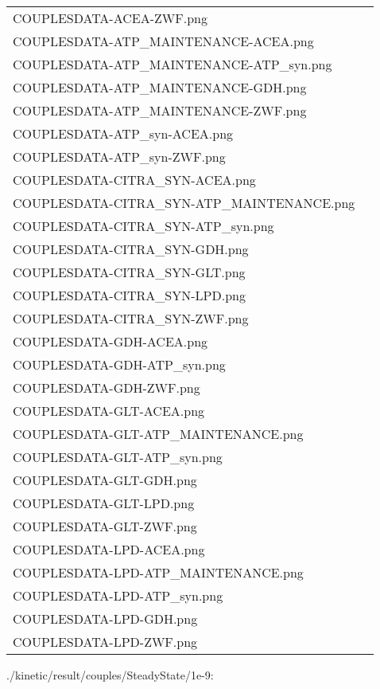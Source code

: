 \documentclass[a4paper, parskip=full]{scrreprt}
\begin{document}
\begin{longtable}{ll}
COUPLESDATA-ACEA-ZWF.png\\
COUPLESDATA-ATP\_MAINTENANCE-ACEA.png\\
COUPLESDATA-ATP\_MAINTENANCE-ATP\_syn.png\\
COUPLESDATA-ATP\_MAINTENANCE-GDH.png\\
COUPLESDATA-ATP\_MAINTENANCE-ZWF.png\\
COUPLESDATA-ATP\_syn-ACEA.png\\
COUPLESDATA-ATP\_syn-ZWF.png\\
COUPLESDATA-CITRA\_SYN-ACEA.png\\
COUPLESDATA-CITRA\_SYN-ATP\_MAINTENANCE.png\\
COUPLESDATA-CITRA\_SYN-ATP\_syn.png\\
COUPLESDATA-CITRA\_SYN-GDH.png\\
COUPLESDATA-CITRA\_SYN-GLT.png\\
COUPLESDATA-CITRA\_SYN-LPD.png\\
COUPLESDATA-CITRA\_SYN-ZWF.png\\
COUPLESDATA-GDH-ACEA.png\\
COUPLESDATA-GDH-ATP\_syn.png\\
COUPLESDATA-GDH-ZWF.png\\
COUPLESDATA-GLT-ACEA.png\\
COUPLESDATA-GLT-ATP\_MAINTENANCE.png\\
COUPLESDATA-GLT-ATP\_syn.png\\
COUPLESDATA-GLT-GDH.png\\
COUPLESDATA-GLT-LPD.png\\
COUPLESDATA-GLT-ZWF.png\\
COUPLESDATA-LPD-ACEA.png\\
COUPLESDATA-LPD-ATP\_MAINTENANCE.png\\
COUPLESDATA-LPD-ATP\_syn.png\\
COUPLESDATA-LPD-GDH.png\\
COUPLESDATA-LPD-ZWF.png
\end{longtable}

./kinetic/result/couples/SteadyState/1e-9:
\end{document}
